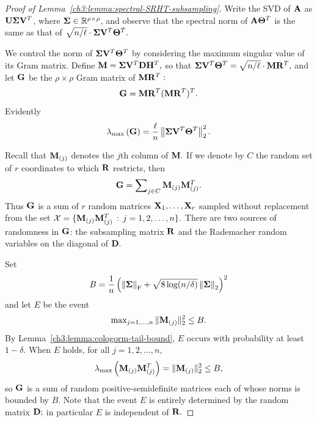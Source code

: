 \begin{proof}[Proof of Lemma~\ref{ch3:lemma:spectral-SRHT-subsampling}]

Write the SVD of $\mathbf{A}$ as $\mathbf{U} \mathbf{\Sigma} \mathbf{V}^T$, where $\mathbf{\Sigma} \in 
\mathbb{R}^{\rho \times \rho}$, and observe that the spectral norm of 
$\mathbf{A}\mathbf{\Theta}^T$ is the same as that of 
$\sqrt{n/\ell} \cdot \mathbf{\Sigma} \mathbf{V}^T\mathbf{\Theta}^T.$

We control the norm of $\mathbf{\Sigma} \mathbf{V}^T \mathbf{\Theta}^T$ by considering 
the maximum singular value of its Gram matrix. Define 
$\mathbf{M} = \mathbf{\Sigma} \mathbf{V} ^T \mathbf{D} \mathbf{H} ^T,$ so that 
$\mathbf{\Sigma} \mathbf{V}^T\mathbf{\Theta}^T = \sqrt{n/\ell} \cdot \mathbf{M} \mathbf{R}^T,$
and let $\mathbf{G}$ be the $\rho \times \rho$ 
Gram matrix of $\mathbf{M} \mathbf{R} ^T:$
\[
 \mathbf{G} = \mathbf{M} \mathbf{R} ^T (\mathbf{M} \mathbf{R} ^T) ^T.
\]
Evidently
\begin{equation}
\label{ch3:eqn:gram-identity}
 \lambda_{\mathrm{max}}\left(\mathbf{G}\right) = 
 \frac{\ell}{n} \left\|\mathbf{\Sigma} \mathbf{V} ^T \mathbf{\Theta} ^T\right\|_2^2.
\end{equation}

Recall that $\mathbf{M}_{(j)}$ denotes the $j$th column of $\mathbf{M}.$ If we denote 
by $C$ the random set of $r$ coordinates to which $\mathbf{R}$ restricts, then
\[
 \mathbf{G} = \sum\nolimits_{j \in C} \mathbf{M}_{(j)} \mathbf{M}_{(j)}^T.
\]
Thus $\mathbf{G}$ is a sum of $r$ random matrices $\mathbf{X}_1, \ldots, \mathbf{X}_r$ 
sampled without replacement from the set 
$\mathcal{X} = 
 \{ \mathbf{M}_{(j)} \mathbf{M}_{(j)}^T \,:\, j=1,2,\ldots,n\}.$
There are two sources of randomness in $\mathbf{G}$: the subsampling matrix $\mathbf{R}$ and the Rademacher 
random variables on the diagonal of $\mathbf{D}.$

Set
\[
 B = \frac{1}{n} \left( \left\|\mathbf{\Sigma}\right\|_\mathrm{F} +
 \sqrt{8 \log(n/\delta)} \left\|\mathbf{\Sigma}\right\|_2 \right)^2
 \]
and let $E$ be the event
\[
 \max\nolimits_{j=1,\ldots,n}\|\mathbf{M}_{(j)}\|_2^2 \leq B.
\]
By Lemma~\ref{ch3:lemma:cologorm-tail-bound},
$E$ occurs with probability at least $1-\delta.$
When $E$ holds, for all $j =1,2,\ldots,n,$
\[
 \lambda_{\mathrm{max}}\left(\mathbf{M}_{(j)} \mathbf{M}_{(j)}^T\right) = 
 \|\mathbf{M}_{(j)}\|_2^2 \leq B,
\]
so $\mathbf{G}$ is a sum of random positive-semidefinite matrices each of whose 
norms is bounded by $B.$ Note that the event $E$ is entirely
determined by the random matrix $\mathbf{D};$ in particular $E$ is independent of $\mathbf{R}.$


\end{proof}
